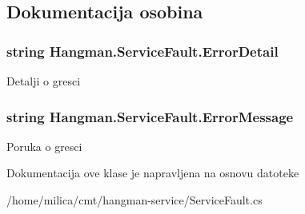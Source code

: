 \subsection{Dokumentacija osobina}
\hypertarget{classHangman_1_1ServiceFault_a97e5276c41ba1724fcb03937349952bc}{}
\subsubsection[{Error\+Detail}]{\setlength{\rightskip}{0pt plus 5cm}string Hangman.\+Service\+Fault.\+Error\+Detail\hspace{0.3cm}{\ttfamily [get]}}\label{classHangman_1_1ServiceFault_a97e5276c41ba1724fcb03937349952bc}
Detalji o gresci \hypertarget{classHangman_1_1ServiceFault_a92f02b37a1a5c038078618d37701c6f4}{}
\subsubsection[{Error\+Message}]{\setlength{\rightskip}{0pt plus 5cm}string Hangman.\+Service\+Fault.\+Error\+Message\hspace{0.3cm}{\ttfamily [get]}}\label{classHangman_1_1ServiceFault_a92f02b37a1a5c038078618d37701c6f4}
Poruka o gresci 

Dokumentacija ove klase je napravljena na osnovu datoteke \begin{DoxyCompactItemize}
\item 
/home/milica/cmt/hangman-\/service/Service\+Fault.\+cs\end{DoxyCompactItemize}
